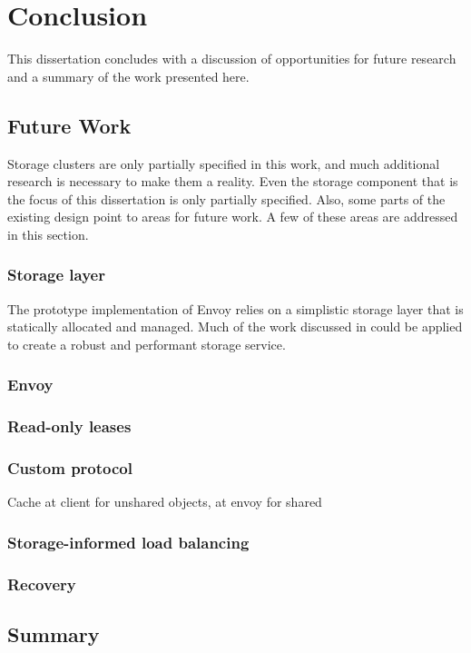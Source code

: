 \chapter{Conclusion}\label{cha:conclusion}

This dissertation concludes with a discussion of opportunities for future research and a summary of the work presented here.

\section{Future Work}

Storage clusters are only partially specified in this work, and much additional research is necessary to make them a reality. Even the storage component that is the focus of this dissertation is only partially specified. Also, some parts of the existing design point to areas for future work. A few of these areas are addressed in this section.

\subsection{Storage layer}

The prototype implementation of Envoy relies on a simplistic storage layer that is statically allocated and managed. Much of the work discussed in  could be applied to create a robust and performant storage service. 

\subsection{Envoy}

\subsection{Read-only leases}
\subsection{Custom protocol}
Cache at client for unshared objects, at envoy for shared
\subsection{Storage-informed load balancing}
\subsection{Recovery}

\section{Summary}
